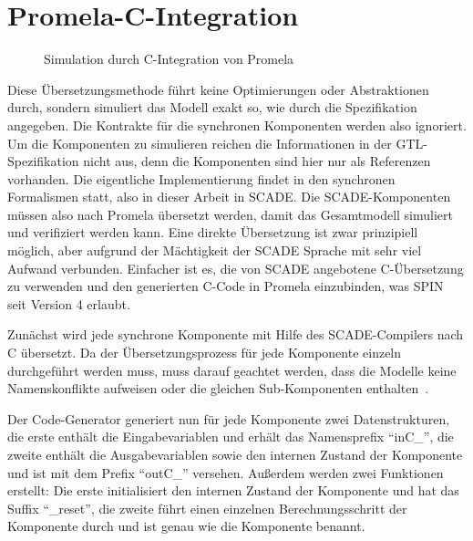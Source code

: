 \section{Promela-C-Integration}
\label{sec:c_integration}
\begin{figure}
  \centering
  \caption{Simulation durch C-Integration von Promela}
\end{figure}

Diese Übersetzungsmethode führt keine Optimierungen oder Abstraktionen durch, sondern simuliert das Modell exakt so, wie durch die Spezifikation angegeben.
Die Kontrakte für die synchronen Komponenten werden also ignoriert.
Um die Komponenten zu simulieren reichen die Informationen in der GTL-Spezifikation nicht aus, denn die Komponenten sind hier nur als Referenzen vorhanden.
Die eigentliche Implementierung findet in den synchronen Formalismen statt, also in dieser Arbeit in SCADE.
Die SCADE-Komponenten müssen also nach Promela übersetzt werden, damit das Gesamtmodell simuliert und verifiziert werden kann.
Eine direkte Übersetzung ist zwar prinzipiell möglich, aber aufgrund der Mächtigkeit der SCADE Sprache mit sehr viel Aufwand verbunden.
Einfacher ist es, die von SCADE angebotene C-Übersetzung zu verwenden und den generierten C-Code in Promela einzubinden, was SPIN seit Version 4 erlaubt.

Zunächst wird jede synchrone Komponente mit Hilfe des SCADE-Compilers nach C übersetzt.
Da der Übersetzungsprozess für jede Komponente einzeln durchgeführt werden muss, muss darauf geachtet werden, dass die Modelle keine Namenskonflikte aufweisen oder die gleichen Sub-Komponenten enthalten~\cite{scade_c_integration}.

Der Code-Generator generiert nun für jede Komponente zwei Datenstrukturen, die erste enthält die Eingabevariablen und erhält das Namensprefix "`inC\_"', die zweite enthält die Ausgabevariablen sowie den internen Zustand der Komponente und ist mit dem Prefix "`outC\_"' versehen.
Außerdem werden zwei Funktionen erstellt:
Die erste initialisiert den internen Zustand der Komponente und hat das Suffix "`\_reset"', die zweite führt einen einzelnen Berechnungsschritt der Komponente durch und ist genau wie die Komponente benannt.

